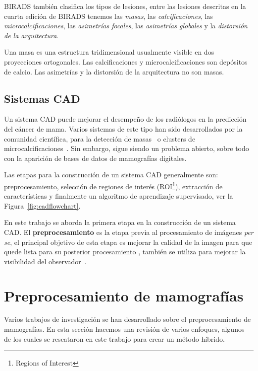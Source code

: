 BIRADS también clasifica los tipos de lesiones, entre las lesiones descritas en
la cuarta edición de BIRADS tenemos las \textit{masas}, las
\textit{calcificaciones}, las \textit{microcalcificaciones}, las
\textit{asimetrías focales}, las \textit{asimetrías globales} y la
\textit{distorsión de la arquitectura}. 

Una masa es una estructura tridimensional usualmente visible en dos
proyecciones ortogonales. Las calcificaciones y microcalcificaciones son
depósitos de calcio. Las asimetrías y la distorsión de la arquitectura no son
masas.

\subsection{Sistemas CAD}

Un sistema CAD puede mejorar el desempeño de los radiólogos en la predicción
del cáncer de mama. Varios sistemas de este tipo han sido desarrollados por la
comunidad científica, para la detección de masas~\cite{bellotti2006completely}
o clusters de microcalcificaciones~\cite{yu2000cad}. Sin embargo, sigue siendo
un problema abierto, sobre todo con la aparición de bases de datos de
mamografías digitales.

Las etapas para la construcción de un sistema CAD generalmente son:
preprocesamiento, selección de regiones de interés (ROI\footnote{Regions of
Interest}), extracción de características y finalmente un algoritmo de
aprendizaje supervisado, ver la Figura~\ref{fig:cadflowchart}.

\shorthandoff{>} %
    
\shorthandon{>} 

En este trabajo se aborda la primera etapa en la construcción de un sistema
CAD. El \textbf{preprocesamiento} es la etapa previa al procesamiento de
imágenes \textit{per se}, el principal objetivo de esta etapa es mejorar la
calidad de la imagen para que quede lista para su posterior procesamiento
\cite{ponraj2011survey}, también se utiliza para mejorar la visibilidad del
observador~\cite{rahmati2010new}. 

\section{Preprocesamiento de mamografías}

Varios trabajos de investigación se han desarrollado sobre el preprocesamiento
de mamografías. En esta sección hacemos una revisión de varios enfoques,
algunos de los cuales se rescataron en este trabajo para crear un método híbrido.

